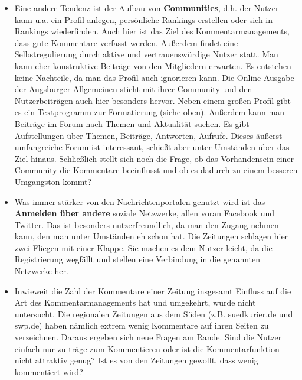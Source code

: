 \begin{itemize}
\item Eine andere Tendenz ist der Aufbau von {\bfseries Communities}, d.h. der Nutzer kann u.a. ein Profil anlegen, persönliche Rankings erstellen oder sich in Rankings wiederfinden. Auch hier ist das Ziel des Kommentarmanagements, dass gute Kommentare verfasst werden. Außerdem findet eine Selbstregulierung durch aktive und vertrauenswürdige Nutzer statt. Man kann eher konstruktive Beiträge von den Mitgliedern erwarten. Es entstehen keine Nachteile, da man das Profil auch ignorieren kann.
Die Online-Ausgabe der Augsburger Allgemeinen sticht mit ihrer Community und den Nutzerbeiträgen auch hier besonders hervor. Neben einem großen Profil gibt es ein Textprogramm zur Formatierung (siehe oben). Außerdem kann man Beiträge im Forum nach Themen und Aktualität suchen. Es gibt Aufstellungen über Themen, Beiträge, Antworten, Aufrufe. Dieses äußerst umfangreiche Forum ist interessant, schießt aber unter Umständen über das Ziel hinaus. 
Schließlich stellt sich noch die Frage, ob das Vorhandensein einer Community die Kommentare beeinflusst und ob es dadurch zu einem besseren Umgangston kommt?

\item Was immer stärker von den Nachrichtenportalen genutzt wird ist das
{\bfseries Anmelden über andere} soziale Netzwerke, allen voran Facebook und Twitter. Das ist besonders nutzerfreundlich, da man den Zugang nehmen kann, den man unter Umständen eh schon hat. Die Zeitungen schlagen hier zwei Fliegen mit einer Klappe. Sie machen es dem Nutzer leicht, da die Registrierung wegfällt und stellen eine Verbindung in die genannten Netzwerke her. 

\item Inwieweit die Zahl der Kommentare einer Zeitung insgesamt Einfluss auf die Art des Kommentarmanagements hat und umgekehrt, wurde nicht
untersucht. Die regionalen Zeitungen aus dem Süden (z.B. suedkurier.de und swp.de) haben nämlich extrem wenig Kommentare auf ihren Seiten zu verzeichnen. 
Daraus ergeben sich neue Fragen am Rande. Sind die Nutzer einfach nur zu träge zum Kommentieren oder
ist die Kommentarfunktion nicht attraktiv genug? Ist es von den Zeitungen gewollt, dass wenig kommentiert wird? 

\end{itemize}




